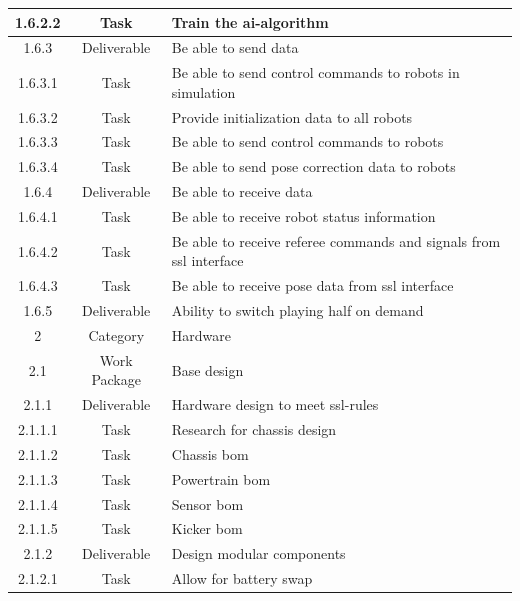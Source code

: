 \begin{longtable}{|c|c|m{}|}
    \rowcolor{c1-t} 1.6.2.2 & Task & Train the \acs{ai}-algorithm \\ \hline
    \rowcolor{c1-d} 1.6.3 & Deliverable & Be able to send data \\ \hline
    \rowcolor{c1-t} 1.6.3.1 & Task & Be able to send control commands to robots in simulation \\ \hline
    \rowcolor{c1-t} 1.6.3.2 & Task & Provide initialization data to all robots \\ \hline
    \rowcolor{c1-t} 1.6.3.3 & Task & Be able to send control commands to robots \\ \hline
    \rowcolor{c1-t} 1.6.3.4 & Task & Be able to send pose correction data to robots \\ \hline
    \rowcolor{c1-d} 1.6.4 & Deliverable & Be able to receive data \\ \hline
    \rowcolor{c1-t} 1.6.4.1 & Task & Be able to receive robot status information \\ \hline
    \rowcolor{c1-t} 1.6.4.2 & Task & Be able to receive referee commands and signals from \acs{ssl} interface \\ \hline
    \rowcolor{c1-t} 1.6.4.3 & Task & Be able to receive pose data from \acs{ssl} interface \\ \hline
    \rowcolor{c1-d} 1.6.5 & Deliverable & Ability to switch playing half on demand \\ \hline
    \rowcolor{c2} 2 & Category & Hardware \\ \hline
    \rowcolor{c2-wp} 2.1 & Work Package & Base design \\ \hline
    \rowcolor{c2-d} 2.1.1 & Deliverable & Hardware design to meet \acs{ssl}-rules \\ \hline
    \rowcolor{c2-t} 2.1.1.1 & Task & Research for chassis design \\ \hline
    \rowcolor{c2-t} 2.1.1.2 & Task & Chassis \acs{bom}\\ \hline
    \rowcolor{c2-t} 2.1.1.3 & Task & Powertrain \acs{bom} \\ \hline
    \rowcolor{c2-t} 2.1.1.4 & Task & Sensor \acs{bom} \\ \hline
    \rowcolor{c2-t} 2.1.1.5 & Task & Kicker \acs{bom} \\ \hline
    \rowcolor{c2-d} 2.1.2 & Deliverable & Design modular components \\ \hline
    \rowcolor{c2-t} 2.1.2.1 & Task & Allow for battery swap \\ \hline

\end{longtable}

